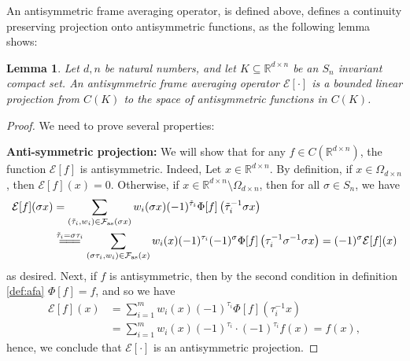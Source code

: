 \documentclass{amsart}
\theoremstyle{plain}
\newtheorem{lemma}{Lemma}
\theoremstyle{definition}
\theoremstyle{remark}
\newtheorem*{remark}{Remark}
\newcommand{\RR}{\mathbb{R}}
\newcommand{\NN}{\mathbb{N}}
\begin{document}
An antisymmetric frame averaging operator, is defined above, defines a continuity preserving projection onto antisymmetric functions, as the following lemma shows: 
\begin{lemma} \label{lemma:bec}
Let $d,n$ be natural numbers, and let $K\subseteq \RR^{d\times n}$ be an $S_n$ invariant compact set. An antisymmetric frame averaging operator $\mathcal{E}[\cdot]$ is a bounded linear projection from $C(K) $ to the space of antisymmetric functions in  $C(K)$.
\end{lemma}
\begin{proof}
  We need to prove several properties:






 
 \textbf{Anti-symmetric projection:} We will show that for any $f\in C(\RR^{d\times n})$, the function $\mathcal{E}[f] $ is antisymmetric. Indeed, Let $x \in \RR^{d \times n}$. By definition, if $x \in \Omega_{d \times n}$, then $\mathcal{E}[f](x) = 0$. Otherwise, if $x \in \RR^{d\times n} \setminus{\Omega_{d \times n}}$, then for all $\sigma \in S_n$, we have
  \begin{equation} \label{eq:antisframecond1}
\begin{split}
  \mathcal{E}[f](\sigma x) &= \sum_{\left(\tilde{\tau}_i, w_i \right) \in \mathcal{F}_{\text{as}}(\sigma x)}{w_i(\sigma x)(-1)^{\tilde{\tau}_i}\Phi[f]\left(\tilde{\tau}_i^{-1} \sigma x \right)} \\ 
  &\stackrel{\tilde{\tau}_i = \sigma \tau_i}{{=\joinrel=\joinrel=}} \sum_{\left(\sigma \tau_i, w_i \right) \in \mathcal{F}_{\text{as}}(x)}{w_i(x)(-1)^{\tau_i}(-1)^{\sigma}\Phi[f]\left(\tau_i^{-1} \sigma^{-1}\sigma x \right)} = (-1)^{\sigma}\mathcal{E}[f](x)
\end{split} 
\end{equation} 
as desired. Next, if $f$ is antisymmetric, then by the second condition in definition \ref{def:afa} $\Phi[f]=f$, and  so  we have
\begin{equation} \label{eq:antisframecond2}
\begin{split}
  \mathcal{E}[f](x) &= \sum_{i=1}^{m}{w_i(x)(-1)^{\tau_i}\Phi[f]\left(\tau_i^{-1} x \right)} \\ 
  &= \sum_{i=1}^{m}{w_i(x)(-1)^{\tau_i}\cdot (-1)^{\tau_i}f\left( x \right)} = f(x),
\end{split} 
\end{equation}
hence, we conclude that $\mathcal{E}[\cdot]$ is an antisymmetric projection.


\end{proof}
\end{document}
